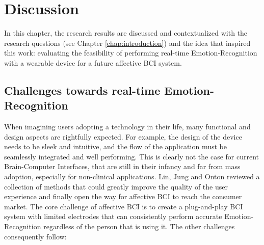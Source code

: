 \chapter{Discussion}
\label{chap:discussion}
In this chapter, the research results are discussed and contextualized with the research questions (see Chapter \ref{chap:introduction}) and the idea that inspired this work: evaluating the feasibility of performing real-time Emotion-Recognition with a wearable device for a future affective \ac{BCI} system. 

\section{Challenges towards real-time Emotion-Recognition}
\label{sec:challenges}
When imagining users adopting a technology in their life, many functional and design aspects are rightfully expected. For example, the design of the device needs to be sleek and intuitive, and the flow of the application must be seamlessly integrated and well performing. This is clearly not the case for current Brain-Computer Interfaces, that are still in their infancy and far from mass adoption, especially for non-clinical applications. Lin, Jung and Onton \cite{lin_toward_2015} reviewed a collection of methods that could greatly improve the quality of the user experience and finally open the way for affective \ac{BCI} to reach the consumer market. The core challenge of affective \ac{BCI}  is to create a plug-and-play \ac{BCI}  system with limited electrodes that can consistently perform accurate Emotion-Recognition regardless of the person that is using it. The other challenges consequently follow:
